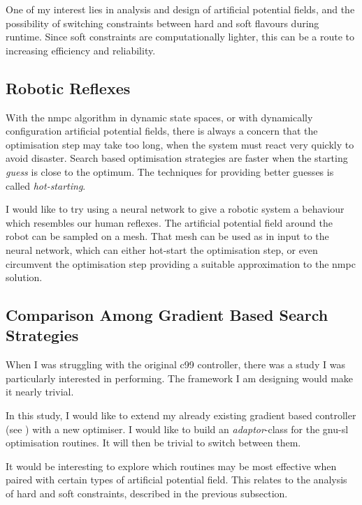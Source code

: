 One of my interest lies in analysis and design of artificial potential fields,
and the possibility of switching constraints between hard and soft flavours
during runtime. Since soft constraints are computationally lighter, this can be
a route to increasing efficiency and reliability.


\subsection{Robotic Reflexes}

With the \ac{nmpc} algorithm in dynamic state spaces, or with dynamically
configuration artificial potential fields, there is always a concern that the
optimisation step may take too long, when the system must react very quickly to
avoid disaster. Search based optimisation strategies are faster when the
starting \emph{guess} is close to the optimum. The techniques for providing
better guesses is called \emph{hot-starting}.

I would like to try using a neural network to give a robotic system a behaviour
which resembles our human reflexes. The artificial potential field around the
robot can be sampled on a mesh. That mesh can be used as in input to the neural
network, which can either hot-start the optimisation step, or even circumvent
the optimisation step providing a suitable approximation to the \ac{nmpc}
solution.


\subsection{Comparison Among Gradient Based Search Strategies}

When I was struggling with the original \ac{c99} controller, there was a study I
was particularly interested in performing. The framework I am designing would
make it nearly trivial.

In this study, I would like to extend my already existing gradient based
controller (see ) with a new optimiser. I would like to
build an \emph{adaptor}-class for the \ac{gnu-sl} optimisation routines. It will
then be trivial to switch between them.

It would be interesting to explore which routines may be most effective when
paired with certain types of artificial potential field. This relates to the
analysis of hard and soft constraints, described in the previous subsection.


